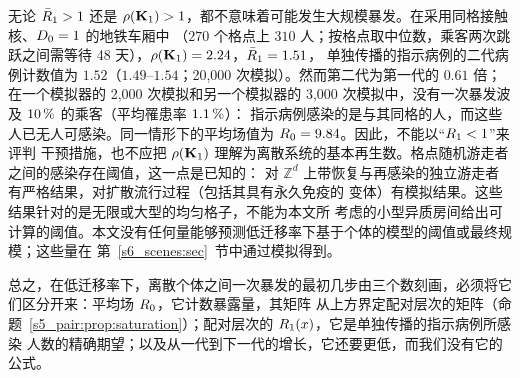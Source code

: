 \begin{remark}\label{s5_pair:rem:threshold}
无论 $\bar{R}_1>1$ 还是 $\rho(\mathbf{K}_1)>1$，都不意味着可能发生大规模暴发。在采用同格接触核、$D_0=1$ 的地铁车厢中
（$270$ 个格点上 $310$ 人；按格点取中位数，乘客两次跳跃之间需等待 48 天），$\rho(\mathbf{K}_1)=2.24$，$\bar{R}_1=1.51$，
单独传播的指示病例的二代病例计数值为 $1.52$（$1.49$--$1.54$；20{,}000 次模拟）。然而第二代为第一代的 $0.61$ 倍；
在一个模拟器的 2{,}000 次模拟和另一个模拟器的 3{,}000 次模拟中，没有一次暴发波及 $10\,\%$ 的乘客（平均罹患率 $1.1\,\%$）：
指示病例感染的是与其同格的人，而这些人已无人可感染。同一情形下的平均场值为 $R_0=9.84$。因此，不能以“$R_1<1$”来评判
干预措施，也不应把 $\rho(\mathbf{K}_1)$ 理解为离散系统的基本再生数。格点随机游走者之间的感染存在阈值，这一点是已知的：
对 $\mathbb{Z}^d$ 上带恢复与再感染的独立游走者有严格结果\citep{kesten2006phase}，对扩散流行过程（包括其具有永久免疫的
变体）有模拟结果\citep{maia2007diffusive,carvalho2025generalized}。这些结果针对的是无限或大型的均匀格子，不能为本文所
考虑的小型异质房间给出可计算的阈值。本文没有任何量能够预测低迁移率下基于个体的模型的阈值或最终规模；这些量在
第~\ref{s6_scenes:sec}~节中通过模拟得到。
\end{remark}

总之，在低迁移率下，离散个体之间一次暴发的最初几步由三个数刻画，必须将它们区分开来：平均场 $R_0$，它计数暴露量，其矩阵
从上方界定配对层次的矩阵（命题~\ref{s5_pair:prop:saturation}）；配对层次的 $R_1(x)$，它是单独传播的指示病例所感染
人数的精确期望；以及从一代到下一代的增长，它还要更低，而我们没有它的公式。

